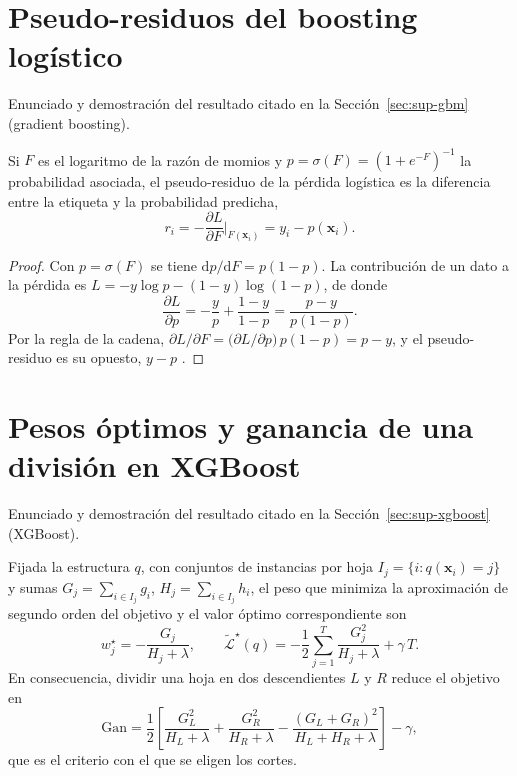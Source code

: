 \section{Pseudo-residuos del boosting logístico}
\label{anx:gbm-residuo}

Enunciado y demostración del resultado citado en la Sección~\ref{sec:sup-gbm} (gradient boosting).

\begin{proposicion}
\label{prop:gbm-residuo}
Si $F$ es el logaritmo de la razón de momios y $p = \sigma(F) = (1 + e^{-F})^{-1}$ la probabilidad asociada, el pseudo-residuo de la pérdida logística es la diferencia entre la etiqueta y la probabilidad predicha,
\[
r_i = -\frac{\partial L}{\partial F}\bigg|_{F(\mathbf{x}_i)} = y_i - p(\mathbf{x}_i).
\]
\end{proposicion}

\begin{proof}
Con $p = \sigma(F)$ se tiene $\mathrm{d}p/\mathrm{d}F = p(1-p)$. La contribución de un dato a la pérdida es $L = -y\log p - (1-y)\log(1-p)$, de donde
\[
\frac{\partial L}{\partial p} = -\frac{y}{p} + \frac{1-y}{1-p} = \frac{p - y}{p(1-p)}.
\]
Por la regla de la cadena, $\partial L/\partial F = \big(\partial L/\partial p\big)\,p(1-p) = p - y$, y el pseudo-residuo es su opuesto, $y - p$ \cite{friedman2001}.
\end{proof}

\section{Pesos óptimos y ganancia de una división en XGBoost}
\label{anx:xgb}

Enunciado y demostración del resultado citado en la Sección~\ref{sec:sup-xgboost} (XGBoost).

\begin{proposicion}
\label{prop:xgb-score}
Fijada la estructura $q$, con conjuntos de instancias por hoja $I_j = \{i : q(\mathbf{x}_i) = j\}$ y sumas $G_j = \sum_{i \in I_j} g_i$, $H_j = \sum_{i \in I_j} h_i$, el peso que minimiza la aproximación de segundo orden del objetivo y el valor óptimo correspondiente son
\[
w_j^{\star} = -\frac{G_j}{H_j + \lambda},
\qquad
\widetilde{\mathcal{L}}^{\star}(q) = -\frac{1}{2}\sum_{j=1}^{T} \frac{G_j^2}{H_j + \lambda} + \gamma\, T.
\]
En consecuencia, dividir una hoja en dos descendientes $L$ y $R$ reduce el objetivo en
\[
\mathrm{Gan} = \frac{1}{2}\left[\frac{G_L^2}{H_L + \lambda} + \frac{G_R^2}{H_R + \lambda} - \frac{(G_L + G_R)^2}{H_L + H_R + \lambda}\right] - \gamma,
\]
que es el criterio con el que se eligen los cortes.
\end{proposicion}

